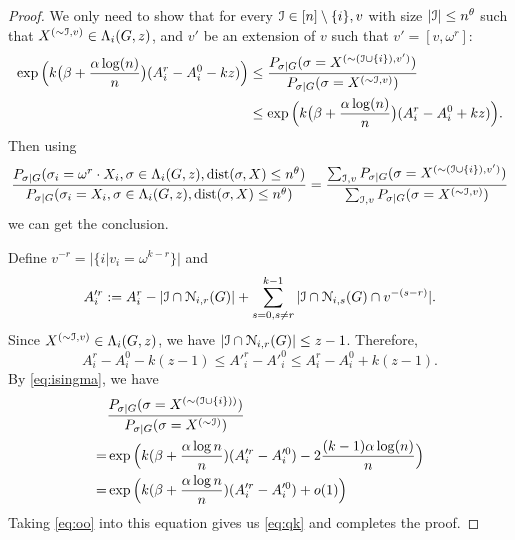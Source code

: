 \documentclass{article}
\begin{document}
\begin{proof}
	We only need to show that for every $\mathcal{I}\in [n]\setminus\{i\},v$ with size $|\mathcal{I}|\le n^\theta$ such that $X^{(\sim\mathcal{I},v)}\in \Lambda_i(G,z)$,
	and $v'$ be an extension of $v$ such that $v'=[v, \omega^r]$:
	\begin{equation} \label{eq:qk}
	\begin{aligned}
	\exp\Big(k\big(\beta+\frac{\alpha\log(n)}{n} \big) (A^r_i-A^0_i - kz) \Big) & \le 
	\frac{P_{\sigma|G}(\sigma= X^{(\sim(\mathcal{I}\cup\{i\}), v')} ) } { P_{\sigma|G}(\sigma= X^{(\sim\mathcal{I},v)} ) } \\
	& \le \exp\Big(k\big(\beta+\frac{\alpha\log(n)}{n} \big) (A^r_i-A^0_i + kz) \Big) .
	\end{aligned}
	\end{equation}
	Then using 
	$$
	\frac{P_{\sigma|G}(\sigma_i= \omega^r \cdot X_i, \sigma\in \Lambda_i(G,z) ,\operatorname{dist}(\sigma, X) \le n^{\theta} ) } 
	{ P_{\sigma|G}(\sigma_i=X_i, \sigma\in \Lambda_i(G,z) ,\operatorname{dist}(\sigma, X) \le n^{\theta} ) } 
	= \frac{\sum_{\mathcal{I}, v} P_{\sigma|G}(\sigma= X^{(\sim(\mathcal{I}\cup\{i\}), v')} ) } {\sum_{\mathcal{I}, v} P_{\sigma|G}(\sigma= X^{(\sim\mathcal{I},v)} ) } 
	$$
	we can get the conclusion.
	
	Define $v^{-r} = |\{i | v_i = \omega^{k-r}\}|$ and
	$$
	A'^r_i :=A^r_i-|\mathcal{I}\cap \mathcal{N}_{i,r}(G)| + \sum_{s=0, s\neq r}^{k-1}|\mathcal{I}\cap \mathcal{N}_{i,s}(G) \cap v^{-(s-r)}| .
	$$
	Since $X^{(\sim\mathcal{I}, v)}\in \Lambda_i(G,z)$, we have $|\mathcal{I}\cap \mathcal{N}_{i,r}(G)| \le z-1$. Therefore,
	\begin{equation} \label{eq:oo}
	A^r_i-A^0_i-k(z-1) \le A'^r_i-A'^0_i\le A^r_i-A^0_i+k(z-1) .
	\end{equation}
	By \eqref{eq:isingma}, we have
	\begin{align*}
	& \frac{P_{\sigma|G}(\sigma= X^{(\sim(\mathcal{I}\cup\{i\}))} ) } { P_{\sigma|G}(\sigma= X^{(\sim\mathcal{I})} ) } \\
	= & \exp\Big(k(\beta+\frac{\alpha\log n }{n})(A'^r_i-A'^0_i)
	-2\frac{(k-1)\alpha\log(n)}{n}
	\Big)
	\\
	= & \exp\Big(k(\beta+\frac{\alpha\log n }{n})(A'^r_i-A'^0_i)+o(1) \Big)
	\end{align*}
	Taking \eqref{eq:oo} into this equation gives us \eqref{eq:qk} and completes the proof.
\end{proof}
\end{document}
